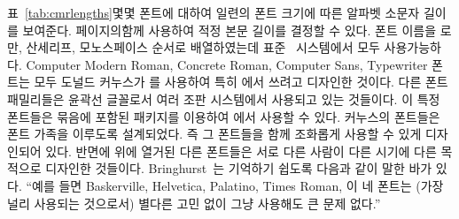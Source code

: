 표~\ref{tab:cmrlengths}\는 몇몇 폰트에 대하여 일련의 폰트 크기에 따른
알파벳 소문자 길이를 보여준다. \pageref{tab:copyfitting} 페이지의\과 함께 사용하여 적정 본문 길이를 결정할 수 있다.
폰트 이름을 로만, 산세리프, 모노스페이스 순서로 배열하였는데
표준 \ltx\ 시스템에서 모두 사용가능하다. 
Computer Modern Roman, Concrete Roman, Computer Sans, Typewriter 폰트는
모두 도널드 커누스가 \metafont 를 사용하여 특히 \tx 에서 쓰려고 디자인한 것이다.
다른 폰트 패밀리들은 \pscript{} 윤곽선 글꼴로서 여러 조판 시스템에서 사용되고
있는 것들이다.
이 특정 폰트들은  묶음에 포함된 패키지를 이용하여 \ltx 에서 
사용할 수 있다.
커누스의 폰트들은 폰트 가족을 이루도록 설계되었다. 즉 그 폰트들을 함께
조화롭게 사용할 수 있게 디자인되어 있다.
반면에 위에 열거된 다른 \pscript{} 폰트들은 서로 다른 사람이 다른 시기에 다른
목적으로 디자인한 것들이다.
Bringhurst~\cite[p. 96]{BRINGHURST99}는 기억하기 쉽도록 다음과 같이 말한
바가 있다. “예를 들면 Baskerville, Helvetica, Palatino, Times Roman, 이 네 
폰트는 (가장 널리 사용되는 것으로서) 별다른 고민 없이 그냥 사용해도 큰 문제 없다.”


